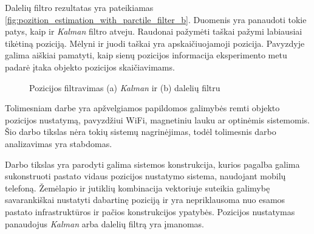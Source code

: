 Dalelių filtro rezultatas yra pateikiamas \ref{fig:pozition_estimation_with_parctile_filter_b}. Duomenis yra panaudoti tokie patys, kaip ir \textit{Kalman} filtro atveju. Raudonai pažymėti taškai pažymi labiausiai tikėtiną poziciją. Mėlyni ir juodi taškai yra apskaičiuojamoji pozicija. Pavyzdyje galima aiškiai pamatyti, kaip sienų pozicijos informacija eksperimento metu padarė įtaka objekto pozicijos skaičiavimams.

\begin{figure}[H]
    \label{fig:pozition_estimation_with_parctile_filter}
    \centering
    \caption{Pozicijos filtravimas (a) \textit{Kalman} ir (b) dalelių filtru \cite{willemsenconcept}}
\end{figure}


Tolimesniam darbe yra apžvelgiamos papildomos galimybės remti objekto pozicijos nustatymą, pavyzdžiui WiFi, magnetiniu lauku ar optinėmis sistemomis. Šio darbo tikslas nėra tokių sistemų nagrinėjimas, todėl tolimesnis darbo analizavimas yra stabdomas.

Darbo tikslas yra parodyti galima sistemos konstrukcija, kurios pagalba galima sukonstruoti pastato vidaus pozicijos nustatymo sistema, naudojant mobilų telefoną. Žemėlapio ir jutiklių kombinacija vektoriuje suteikia galimybę savarankiškai nustatyti dabartinę poziciją ir yra nepriklausoma nuo esamos pastato infrastruktūros ir pačios konstrukcijos ypatybės. Pozicijos nustatymas panaudojus \textit{Kalman} arba dalelių filtrą yra įmanomas.

